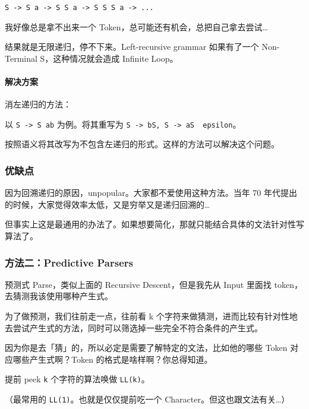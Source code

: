 \documentclass[
]{article}
\begin{document}
\texttt{S\ -\textgreater{}\ S\ a\ -\textgreater{}\ S\ S\ a\ -\textgreater{}\ S\ S\ S\ a\ -\textgreater{}\ ...}

我好像总是拿不出来一个 Token，总可能还有机会，总把自己拿去尝试\ldots{}

结果就是无限递归，停不下来。Left-recursive grammar 如果有了一个
Non-Terminal S，这种情况就会造成 Infinite Loop。

\hypertarget{header-n50}{%
\paragraph{解决方案}\label{header-n50}}

消左递归的方法：

以 \texttt{S\ -\textgreater{}\ S\ a\textbar{}b} 为例。将其重写为
\texttt{S\ -\textgreater{}\ bS,\ S\textquotesingle{}\ -\textgreater{}\ aS\textquotesingle{}\ \textbar{}\ epsilon}。

按照语义将其改写为不包含左递归的形式。这样的方法可以解决这个问题。

\hypertarget{header-n54}{%
\subsubsection{优缺点}\label{header-n54}}

因为回溯递归的原因，unpopular。大家都不爱使用这种方法。当年 70
年代提出的时候，大家觉得效率太低，又是穷举又是递归回溯的\ldots{}

但事实上这是最通用的办法了。如果想要简化，那就只能结合具体的文法针对性写算法了。

\hypertarget{header-n57}{%
\subsubsection{方法二：Predictive Parsers}\label{header-n57}}

预测式 Parse，类似上面的 Recursive Descent，但是我先从 Input 里面找
token，去猜测我该使用哪种产生式。

为了做预测，我们往前走一点，往前看 k
个字符来做猜测，进而比较有针对性地去尝试产生式的方法，同时可以筛选掉一些完全不符合条件的产生式。

因为你是去「猜」的，所以必定是需要了解特定的文法，比如他的哪些 Token
对应哪些产生式啊？Token 的格式是啥样啊？你总得知道。

提前 peek \texttt{k} 个字符的算法唤做 \texttt{LL(k)}。

（最常用的 \texttt{LL(1)}。也就是仅仅提前吃一个
Character。但这也跟文法有关\ldots）
\end{document}
